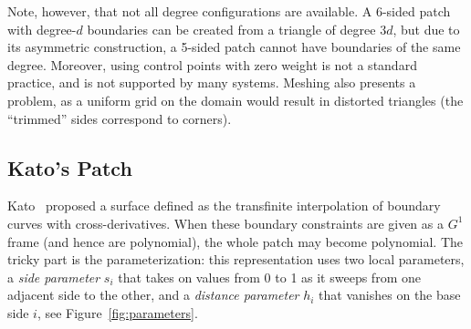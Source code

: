 \documentclass[9pt,academicons]{article}
\begin{document}
Note, however, that not all degree configurations are available. A 6-sided patch with degree-$d$
boundaries can be created from a triangle of degree $3d$, but due to its asymmetric construction,
a 5-sided patch cannot have boundaries of the same degree. Moreover, using control points with zero
weight is not a standard practice, and is not supported by many systems. Meshing
also presents a problem, as a uniform grid on the domain would result in distorted triangles
(the ``trimmed'' sides correspond to corners).

\subsection{Kato's Patch}
Kato~\cite{Kato:1991} proposed a surface defined as the transfinite interpolation of boundary
curves with cross-derivatives. When these boundary constraints are given as a $G^1$ frame (and hence
are polynomial), the whole patch may become polynomial. The tricky part is the parameterization:
this representation uses two local parameters, a \emph{side parameter} $s_i$
that takes on values from 0 to 1 as it sweeps from one adjacent side to the other,
and a \emph{distance parameter} $h_i$ that vanishes on the base side $i$, see
Figure~\ref{fig:parameters}.
\end{document}
